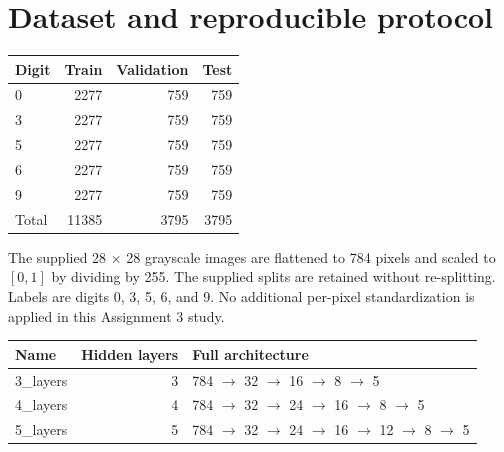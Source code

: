 \documentclass[11pt,a4paper]{article}
\begin{document}
\section{Dataset and reproducible protocol}

\begingroup\small\setlength{\tabcolsep}{5pt}

\begin{tabularx}{\linewidth}{Yrrr}

\toprule

\textbf{Digit} & \textbf{Train} & \textbf{Validation} & \textbf{Test} \\

\midrule

0 & 2277 & 759 & 759 \\

3 & 2277 & 759 & 759 \\

5 & 2277 & 759 & 759 \\

6 & 2277 & 759 & 759 \\

9 & 2277 & 759 & 759 \\

Total & 11385 & 3795 & 3795 \\

\bottomrule\end{tabularx}\endgroup\par\medskip

The supplied 28 $\times$ 28 grayscale images are flattened to 784 pixels and scaled to $[0,1]$ by dividing by 255. The supplied splits are retained without re-splitting. Labels are digits 0, 3, 5, 6, and 9. No additional per-pixel standardization is applied in this Assignment 3 study.


\begingroup\small\setlength{\tabcolsep}{5pt}

\begin{tabularx}{\linewidth}{lrl}

\toprule

\textbf{Name} & \textbf{Hidden layers} & \textbf{Full architecture} \\

\midrule

3\_layers & 3 & 784 $\to$ 32 $\to$ 16 $\to$ 8 $\to$ 5 \\

4\_layers & 4 & 784 $\to$ 32 $\to$ 24 $\to$ 16 $\to$ 8 $\to$ 5 \\

5\_layers & 5 & 784 $\to$ 32 $\to$ 24 $\to$ 16 $\to$ 12 $\to$ 8 $\to$ 5 \\

\bottomrule\end{tabularx}\endgroup\par\medskip
\end{document}
